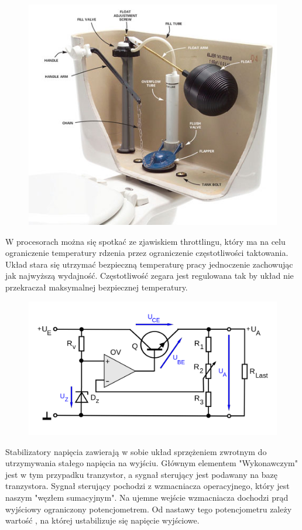 \documentclass{article}
\begin{document}
\begin{figure}
    \includegraphics[width=12cm]{spluczka.jpg}
    \centering
\end{figure}
W procesorach można się spotkać ze zjawiskiem throttlingu, który ma na celu ograniczenie temperatury rdzenia przez ograniczenie częstotliwości taktowania. 
Układ stara się utrzymać bezpieczną temperaturę pracy jednoczenie zachowując jak najwyższą wydajność. 
Częstotliwość zegara jest regulowana tak by układ nie przekraczał maksymalnej bezpiecznej temperatury.
\begin{figure}
    \includegraphics[width=12cm]{stab.png}
    \centering
\end{figure}

Stabilizatory napięcia zawierają w sobie układ sprzężeniem zwrotnym do utrzymywania stałego napięcia na wyjściu. Głównym elementem "Wykonawczym"
jest w tym przypadku tranzystor, a sygnał sterujący jest podawany na bazę tranzystora. Sygnał sterujący pochodzi z wzmacniacza operacyjnego, który jest
naszym "węzłem sumacyjnym". Na ujemne wejście wzmacniacza dochodzi prąd wyjściowy ograniczony potencjometrem. Od nastawy tego potencjometru zależy wartość
, na której ustabilizuje się napięcie wyjściowe.
\end{document}
